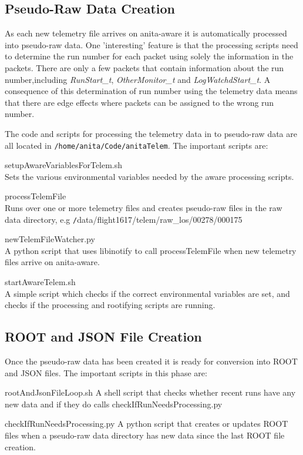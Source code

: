 \documentclass{article}
\begin{document}
\subsection{Pseudo-Raw Data Creation}
As each new telemetry file arrives on anita-aware it is automatically processed into pseudo-raw data. One 'interesting' feature is that the processing scripts need to determine the run number for each packet using solely the information in the packets. There are only a few packets that contain information about the run number,including {\it RunStart\_t}, {\it OtherMonitor\_t} and {\it LogWatchdStart\_t}. A consequence of this determination of run number using the telemetry data means that there are edge effects where packets can be assigned to the wrong run number.

The code and scripts for processing the telemetry data in to pseudo-raw data are all located in {\tt /home/anita/Code/anitaTelem}. The important scripts are:
\begin{description}
\item{setupAwareVariablesForTelem.sh} \\Sets the various environmental variables needed by the aware processing scripts.
\item{processTelemFile} \\Runs over one or more telemetry files and creates pseudo-raw files in the raw data directory, e.g  {\texttt /data/flight1617/telem/raw\_los/00278/000175}
\item{newTelemFileWatcher.py} \\A python script that uses libinotify to call processTelemFile when new telemetry files arrive on anita-aware.
\item{startAwareTelem.sh} \\A simple script which checks if the correct environmental variables are set, and checks if the processing and rootifying scripts are running.
\end{description}

\subsection{ROOT and JSON File Creation}
Once the pseudo-raw data has been created it is ready for conversion into ROOT and JSON files. The important scripts in this phase are:
\begin{description}
\item{rootAndJsonFileLoop.sh} A shell script that checks whether recent runs have any new data and if they do calls checkIfRunNeedsProcessing.py
\item{checkIfRunNeedsProcessing.py} A python script that creates or updates ROOT files when a pseudo-raw data directory has new data since the last ROOT file creation.
\end{description}
\end{document}
